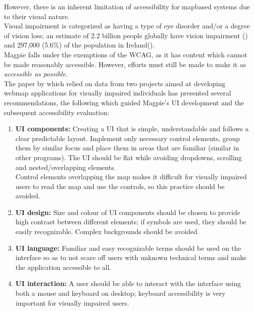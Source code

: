 \noindent However, there is an inherent limitation of accessibility for map\-based systems due to their visual nature.\\
Visual impairment is categorized as having a type of eye disorder and/or a degree of vision loss; an estimate of 2.2 billion people globally have vision impairment (\cite{whoworldreportvision2019}) and 297,000 (5.6\%) of the population in Ireland(\cite{visionirelandcensus}).\\
Magpie falls under the exemptions of the WCAG, as it has content which cannot be made reasonably accessible. However, efforts must still be made to make it as \emph{accessible as possible}.\\
\noindent The paper by \cite{accessibilitywebmapsrecommendations2017} which relied on data from two projects aimed at developing web\-map applications for visually impaired individuals has presented several recommendations, the following which guided Magpie's UI development and the subsequent accessibility evaluation:
\begin{enumerate}
    \item\textbf{UI components:} Creating a UI that is simple, understandable and follows a clear predictable layout. Implement only necessary control elements, group them by similar focus and place them in areas that are familiar (similar in other programs). The UI should be flat while avoiding dropdowns, scrolling and nested/overlapping elements.\\ Control elements overlapping the map makes it difficult for visually impaired users to read the map and use the controls, so this practice should be avoided.\\
    \item\textbf{UI design:} Size and colour of UI components should be chosen to provide high contrast between different elements; if symbols are used, they should be easily recognizable. Complex backgrounds should be avoided.\\
    \item\textbf{UI language:} Familiar and easy recognizable terms should be used on the interface so as to not scare off users with unknown technical terms and make the application accessible to all.\\
    \item\textbf{UI interaction:} A user should be able to interact with the interface using both a mouse and keyboard on desktop; keyboard accessibility is very important for visually impaired users.
\end{enumerate}

